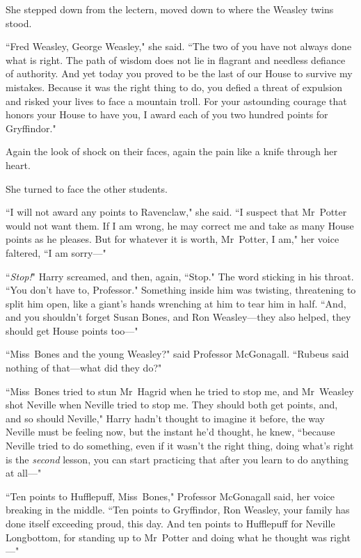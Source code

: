 She stepped down from the lectern, moved down to where the Weasley twins stood.

``Fred Weasley, George Weasley," she said. ``The two of you have not always done what is right. The path of wisdom does not lie in flagrant and needless defiance of authority. And yet today you proved to be the last of our House to survive my mistakes. Because it was the right thing to do, you defied a threat of expulsion and risked your lives to face a mountain troll. For your astounding courage that honors your House to have you, I award each of you two hundred points for Gryffindor."

Again the look of shock on their faces, again the pain like a knife through her heart.

She turned to face the other students.

``I will not award any points to Ravenclaw," she said. ``I suspect that Mr~Potter would not want them. If I am wrong, he may correct me and take as many House points as he pleases. But for whatever it is worth, Mr~Potter, I am," her voice faltered, ``I am sorry—"

\later

``\emph{Stop!}" Harry screamed, and then, again, ``Stop." The word sticking in his throat. ``You don't have to, Professor." Something inside him was twisting, threatening to split him open, like a giant's hands wrenching at him to tear him in half. ``And, and you shouldn't forget Susan Bones, and Ron Weasley—they also helped, they should get House points too—"

``Miss~Bones and the young Weasley?" said Professor McGonagall. ``Rubeus said nothing of that—what did they do?"

``Miss~Bones tried to stun Mr~Hagrid when he tried to stop me, and Mr~Weasley shot Neville when Neville tried to stop me. They should both get points, and, and so should Neville," Harry hadn't thought to imagine it before, the way Neville must be feeling now, but the instant he'd thought, he knew, ``because Neville tried to do something, even if it wasn't the right thing, doing what's right is the \emph{second} lesson, you can start practicing that after you learn to do anything at all—"

``Ten points to Hufflepuff, Miss~Bones," Professor McGonagall said, her voice breaking in the middle. ``Ten points to Gryffindor, Ron Weasley, your family has done itself exceeding proud, this day. And ten points to Hufflepuff for Neville Longbottom, for standing up to Mr~Potter and doing what he thought was right—"

